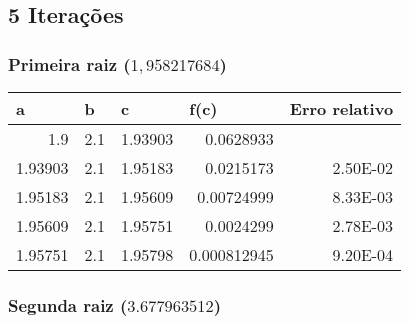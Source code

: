 \documentclass[12pt]{article}
\begin{document}
\subsection{5 Iterações}
\subsubsection{Primeira raiz (\(1,958217684\))}

\begin{table}[H]
\centering
\begin{tabular}{@{}rrrrr@{}}
\toprule
\multicolumn{1}{l}{a} & \multicolumn{1}{l}{b} & \multicolumn{1}{l}{c} & \multicolumn{1}{l}{f(c)} & \multicolumn{1}{l}{Erro relativo} \\ \midrule
1.9                   & 2.1                   & 1.93903               & 0.0628933                & \multicolumn{1}{l}{}              \\
1.93903               & 2.1                   & 1.95183               & 0.0215173                & 2.50E-02                          \\
1.95183               & 2.1                   & 1.95609               & 0.00724999               & 8.33E-03                          \\
1.95609               & 2.1                   & 1.95751               & 0.0024299                & 2.78E-03                          \\
1.95751               & 2.1                   & 1.95798               & 0.000812945              & 9.20E-04                         \\ \bottomrule
\end{tabular}
\end{table}

\subsubsection{Segunda raiz (\(3.677963512\))}
\end{document}
